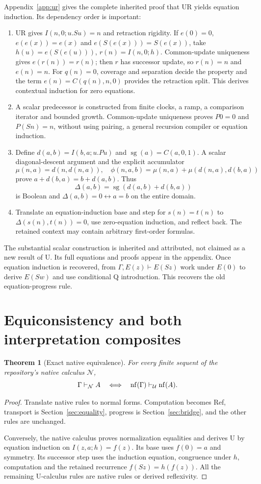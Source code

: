 \documentclass[11pt]{article}
\newtheorem{theorem}{Theorem}[section]
\begin{document}
Appendix~\ref{app:ur} gives the complete inherited proof that UR yields
equation induction. Its dependency order is important:
\begin{enumerate}
\item UR gives $I(n,0;u.Su)=n$ and retraction rigidity. If
$e(0)=0$, $e(e(x))=e(x)$ and $e(S(e(x)))=S(e(x))$, take
$h(u)=e(S(e(u)))$, $r(n)=I(n,0;h)$. Common-update uniqueness gives
$e(r(n))=r(n)$; then $r$ has successor update, so $r(n)=n$ and $e(n)=n$.
For $q(n)=0$, coverage and separation decide the property and the term
$e(n)=C(q(n),n,0)$ provides the retraction split. This derives contextual
induction for zero equations.
\item A scalar predecessor is constructed from finite clocks, a ramp, a
comparison iterator and bounded growth. Common-update uniqueness proves
$P0=0$ and $P(Sn)=n$, without using pairing, a general recursion compiler
or equation induction.
\item Define $d(a,b)=I(b,a;u.Pu)$ and
$\operatorname{sg}(a)=C(a,0,1)$. A scalar diagonal-descent argument and the
explicit accumulator
\[
 \mu(n,a)=d(n,d(n,a)),\quad
 \phi(n,a,b)=\mu(n,a)+\mu(d(n,a),d(b,a))
\]
prove $a+d(b,a)=b+d(a,b)$. Thus
\[
 \Delta(a,b)=\operatorname{sg}(d(a,b)+d(b,a))
\]
is Boolean and $\Delta(a,b)=0\leftrightarrow a=b$ on the entire domain.
\item Translate an equation-induction base and step for $s(n)=t(n)$ to
$\Delta(s(n),t(n))=0$, use zero-equation induction, and reflect back.
The retained context may contain arbitrary first-order formulas.
\end{enumerate}
The substantial scalar construction is inherited and attributed, not
claimed as a new result of U. Its full equations and proofs appear in
the appendix. Once equation induction is recovered, from
$\Gamma,E(z)\vdash E(Sz)$ work under $E(0)$ to derive $E(Sw)$ and use
conditional Q introduction. This recovers the old equation-progress rule.

\section{Equiconsistency and both interpretation composites}
\begin{theorem}[Exact native equivalence]
For every finite sequent of the repository's native calculus $\mathcal N$,
\[
 \Gamma\vdash_{\mathcal N}A
 \quad\Longleftrightarrow\quad
 \operatorname{nf}(\Gamma)\vdash_{\mathcal U}\operatorname{nf}(A).
\]
\end{theorem}
\begin{proof}
Translate native rules to normal forms. Computation becomes Ref,
transport is Section~\ref{sec:equality}, progress is
Section~\ref{sec:bridge}, and the other rules are unchanged.

Conversely, the native calculus proves normalization equalities and
derives U by equation induction on $I(z,a;h)=f(z)$.
Its base uses $f(0)=a$ and symmetry. Its successor step uses the
induction equation, congruence under $h$, computation and the retained
recurrence $f(Sz)=h(f(z))$. All the remaining U-calculus rules are native
rules or derived reflexivity.
\end{proof}
\end{document}

